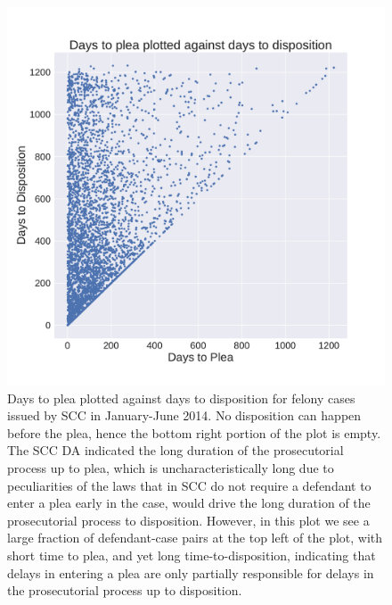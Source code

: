 \documentclass{AISB2008}
\begin{document}
\begin{figure}[h!]
\begin{center}
\includegraphics[width=0.70\columnwidth]{figures/plea_vs_disposition_scatter/plea_vs_disposition_scatter}
\caption{Days to plea plotted against days to disposition for felony cases issued by SCC in January-June 2014. No disposition can happen before the plea, hence the bottom right portion of the plot is empty. The SCC DA indicated the long duration of the prosecutorial process up to plea, which is uncharacteristically long due to peculiarities of the laws that in SCC do not require a defendant to enter a plea early in the case, would drive the long duration of the prosecutorial process to disposition. However, in this plot we see a large fraction of defendant-case pairs at the top left of the plot, with short time to plea, and yet long time-to-disposition, indicating that delays in entering a plea are only partially responsible for delays in the prosecutorial process up to disposition.
\label{fig:PleaVsDisposition}%
}
\end{center}
\end{figure}
\end{document}
